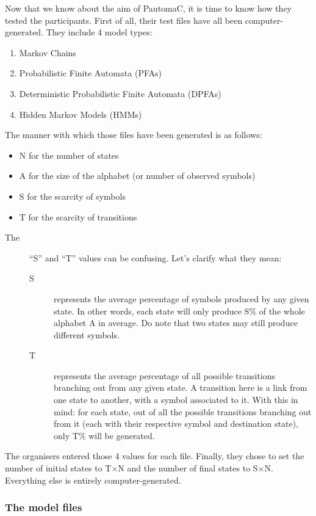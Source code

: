 Now that we know about the aim of PautomaC, it is time to know how
they tested the participants. First of all, their test files have
all been computer-generated. They include 4 model types:
\begin{enumerate}
\item Markov Chains
\item Probabilistic Finite Automata (PFAs)
\item Deterministic Probabilistic Finite Automata (DPFAs)
\item Hidden Markov Models (HMMs)
\end{enumerate}
The manner with which those files have been generated is as follows:
\begin{itemize}
\item N for the number of states
\item A for the size of the alphabet (or number of observed symbols)
\item S for the scarcity of symbols
\item T for the scarcity of transitions\end{itemize}
\begin{description}
\item [{\textmd{The}}] ``S'' and ``T'' values can be confusing. Let's
clarify what they mean:

\begin{description}
\item [{S}] represents the average percentage of symbols produced by any
given state. In other words, each state will only produce S\% of the
whole alphabet A in average. Do note that two states may still produce
different symbols.
\item [{T}] represents the average percentage of all possible transitions
branching out from any given state. A transition here is a link from
one state to another, with a symbol associated to it. With this in
mind: for each state, out of all the possible transitions branching
out from it (each with their respective symbol and destination state),
only T\% will be generated.
\end{description}
\end{description}
The organisers entered those 4 values for each file. Finally, they
chose to set the number of initial states to T$\times$N and the number
of final states to S$\times$N. Everything else is entirely computer-generated. 


\subsubsection{The model files}

